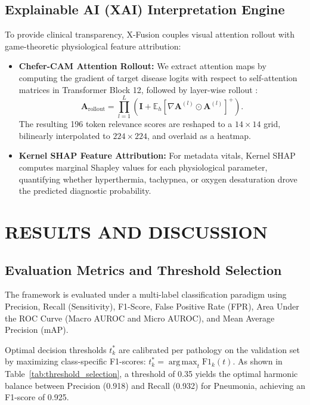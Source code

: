 \documentclass[conference]{IEEEtran}
\begin{document}
\subsection{Explainable AI (XAI) Interpretation Engine}
To provide clinical transparency, X-Fusion couples visual attention rollout with game-theoretic physiological feature attribution:
\begin{itemize}
    \item \textbf{Chefer-CAM Attention Rollout:} We extract attention maps by computing the gradient of target disease logits with respect to self-attention matrices in Transformer Block 12, followed by layer-wise rollout \cite{chefer2021transformer}:
    \begin{equation}
    \mathbf{A}_{\mathrm{rollout}} = \prod_{l=1}^L \left( \mathbf{I} + \mathbb{E}_h \left[ \nabla \mathbf{A}^{(l)} \odot \mathbf{A}^{(l)} \right]^+ \right).
    \end{equation}
    The resulting 196 token relevance scores are reshaped to a $14 \times 14$ grid, bilinearly interpolated to $224 \times 224$, and overlaid as a heatmap.
    \item \textbf{Kernel SHAP Feature Attribution:} For metadata vitals, Kernel SHAP \cite{lundberg2017unified} computes marginal Shapley values for each physiological parameter, quantifying whether hyperthermia, tachypnea, or oxygen desaturation drove the predicted diagnostic probability.
\end{itemize}

\section{RESULTS AND DISCUSSION}

\subsection{Evaluation Metrics and Threshold Selection}
The framework is evaluated under a multi-label classification paradigm using Precision, Recall (Sensitivity), F1-Score, False Positive Rate (FPR), Area Under the ROC Curve (Macro AUROC and Micro AUROC), and Mean Average Precision (mAP).

Optimal decision thresholds $t_k^*$ are calibrated per pathology on the validation set by maximizing class-specific F1-scores: $t_k^* = \operatorname{arg\,max}_{t} \mathrm{F1}_k(t)$. As shown in Table~\ref{tab:threshold_selection}, a threshold of 0.35 yields the optimal harmonic balance between Precision (0.918) and Recall (0.932) for Pneumonia, achieving an F1-score of 0.925.
\end{document}
